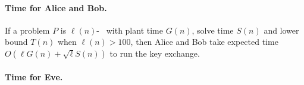 \paragraph{Time for Alice and Bob.}

\begin{lemma}\label{lem:alice-bob-time}
	If a problem $P$ is $\ell(n)$-\keyER~ with plant time $G(n)$, solve time $S(n)$ and lower bound $T(n)$ when $\ell(n)>100$,
	then Alice and Bob take expected time $O(\ell G(n) + \sqrt{\ell} S(n))$ to run the key exchange.
\end{lemma}

\paragraph{Time for Eve.}

